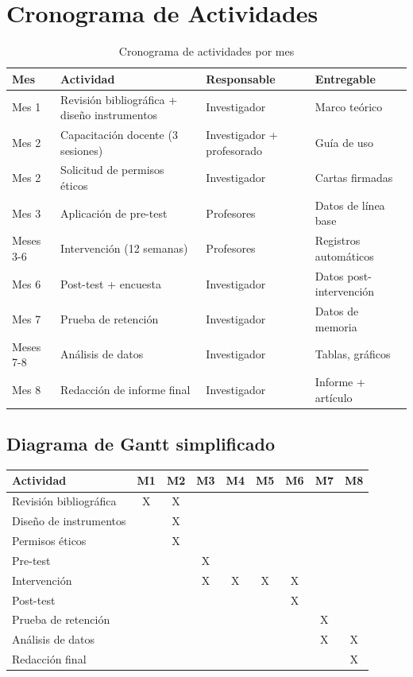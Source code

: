 \documentclass[12pt,spanish]{article}
\begin{document}
\newpage
\section{Cronograma de Actividades}

\begin{table}[H]
\centering
\caption{Cronograma de actividades por mes}
\label{tab:cronograma}
\begin{tabular}{|p{3.5cm}|p{4cm}|p{3.5cm}|p{3.5cm}|}
\hline
\textbf{Mes} & \textbf{Actividad} & \textbf{Responsable} & \textbf{Entregable} \\
\hline
Mes 1 & Revisión bibliográfica + diseño instrumentos & Investigador & Marco teórico \\
\hline
Mes 2 & Capacitación docente (3 sesiones) & Investigador + profesorado & Guía de uso \\
\hline
Mes 2 & Solicitud de permisos éticos & Investigador & Cartas firmadas \\
\hline
Mes 3 & Aplicación de pre-test & Profesores & Datos de línea base \\
\hline
Meses 3-6 & Intervención (12 semanas) & Profesores & Registros automáticos \\
\hline
Mes 6 & Post-test + encuesta & Investigador & Datos post-intervención \\
\hline
Mes 7 & Prueba de retención & Investigador & Datos de memoria \\
\hline
Meses 7-8 & Análisis de datos & Investigador & Tablas, gráficos \\
\hline
Mes 8 & Redacción de informe final & Investigador & Informe + artículo \\
\hline
\end{tabular}
\end{table}

\subsection{Diagrama de Gantt simplificado}

\begin{center}
\begin{tabular}{|l|c|c|c|c|c|c|c|c|}
\hline
\textbf{Actividad} & \textbf{M1} & \textbf{M2} & \textbf{M3} & \textbf{M4} & \textbf{M5} & \textbf{M6} & \textbf{M7} & \textbf{M8} \\
\hline
Revisión bibliográfica & X & X & & & & & & \\
\hline
Diseño de instrumentos & & X & & & & & & \\
\hline
Permisos éticos & & X & & & & & & \\
\hline
Pre-test & & & X & & & & & \\
\hline
Intervención & & & X & X & X & X & & \\
\hline
Post-test & & & & & & X & & \\
\hline
Prueba de retención & & & & & & & X & \\
\hline
Análisis de datos & & & & & & & X & X \\
\hline
Redacción final & & & & & & & & X \\
\hline
\end{tabular}
\end{center}
\end{document}
